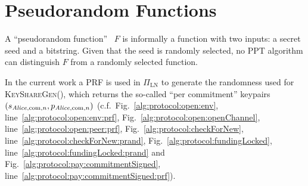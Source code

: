 \section{Pseudorandom Functions}
\label{sec:prf}
  A ``pseudorandom function''~\cite{katzlindell} $F$ is informally a function
  with two inputs: a secret seed and a bitstring. Given that the seed is
  randomly selected, no PPT algorithm can distinguish $F$ from a randomly
  selected function.

  In the current work a PRF is used in $\Pi_{\mathrm{LN}}$ to generate the
  randomness used for \textsc{KeyShareGen}(), which returns the so-called ``per
  commitment'' keypairs $(s_{\mathit{Alice}, \mathrm{com}, n}, p_{\mathit{Alice}, \mathrm{com},
  n})$ (c.f.\ Fig.~\ref{alg:protocol:open:env}, line~\ref{alg:protocol:open:env:prf},
  Fig.~\ref{alg:protocol:open:openChannel},
  line~\ref{alg:protocol:open:peer:prf}, Fig.~\ref{alg:protocol:checkForNew},
  line~\ref{alg:protocol:checkForNew:prand},
  Fig.~\ref{alg:protocol:fundingLocked},
  line~\ref{alg:protocol:fundingLocked:prand} and
  Fig.~\ref{alg:protocol:pay:commitmentSigned},
  line~\ref{alg:protocol:pay:commitmentSigned:prf}).

